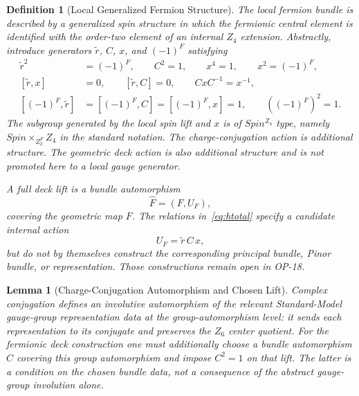 \documentclass[11pt]{article}
\theoremstyle{canonmath}
\newtheorem{lemma}[theorem]{Lemma}
\newtheorem{definition}[theorem]{Definition}
\theoremstyle{canonpostulate}
\theoremstyle{canonclaim}
\def\mathrm#1{#1}%
\def\mathbb#1{#1}%
\begin{document}
\begin{definition}[Local Generalized Fermion Structure] \label{def:spinZ4}
The local fermion bundle is described by a generalized spin structure in which the fermionic central element is identified with the order-two element of an internal $\mathbb Z_4$ extension. Abstractly, introduce generators $\widetilde r$, $C$, $x$, and $(-1)^F$ satisfying
\begin{equation}
\begin{split}
\widetilde r^2&=(-1)^F,\qquad C^2=1,\qquad x^4=1,\qquad x^2=(-1)^F,\\
[\widetilde r,x]&=0,\qquad[\widetilde r,C]=0,\qquad CxC^{-1}=x^{-1},\\
[(-1)^F,\widetilde r]&=[(-1)^F,C]=[(-1)^F,x]=1,
\qquad ((-1)^F)^2=1.
\end{split}
\label{eq:htotal}
\end{equation}
The subgroup generated by the local spin lift and $x$ is of $\mathrm{Spin}^{\mathbb Z_4}$ type, namely $\mathrm{Spin}\times_{\mathbb Z_2^F}\mathbb Z_4$ in the standard notation. The charge-conjugation action is additional structure. The geometric deck action is also additional structure and is not promoted here to a local gauge generator.

A full deck lift is a bundle automorphism
\begin{equation}
\widehat F=(F,U_F),
\end{equation}
covering the geometric map $F$. The relations in~\eqref{eq:htotal} specify a candidate internal action
\begin{equation}
U_F=\widetilde r\,C\,x,
\end{equation}
but do not by themselves construct the corresponding principal bundle, Pinor bundle, or representation. Those constructions remain open in OP-18.
\end{definition}

\begin{lemma}[Charge-Conjugation Automorphism and Chosen Lift] \label{lem:C2}
Complex conjugation defines an involutive automorphism of the relevant Standard-Model gauge-group representation data at the group-automorphism level: it sends each representation to its conjugate and preserves the $\mathbb Z_6$ center quotient. For the fermionic deck construction one must additionally choose a bundle automorphism $C$ covering this group automorphism and impose $C^2=1$ on that lift. The latter is a condition on the chosen bundle data, not a consequence of the abstract gauge-group involution alone.
\end{lemma}
\end{document}
